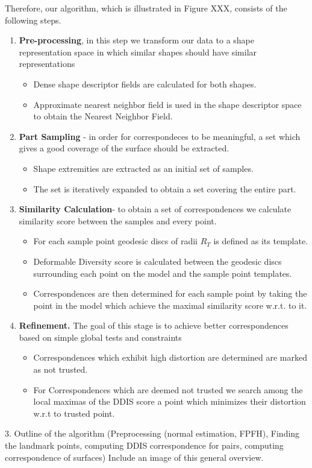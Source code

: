 \documentclass[10pt,twocolumn,letterpaper]{article}
\begin{document}
Therefore, our algorithm, which is illustrated in Figure XXX, consists of the following steps.
\begin{enumerate}
    \item 
    \textbf{Pre-processing}, in this step we transform our data to a shape representation space in which similar shapes should have similar representations
    \begin{itemize}
     \item Dense shape descriptor fields are calculated for both shapes.
     \item Approximate nearest neighbor field is used in the shape descriptor space to obtain the Nearest Neighbor Field.
   \end{itemize}
   \item
   \textbf{Part Sampling} - in order for correspondeces to be meaningful, a set which gives a good coverage of the surface should be extracted.
   \begin{itemize}
     \item Shape extremities are extracted as an initial set of samples.
     \item The set is iteratively expanded to obtain a set covering the entire part.
   \end{itemize}
   \item
   \textbf{Similarity Calculation}- to obtain a set of correspondences we calculate similarity score between the samples and every point.
      \begin{itemize}
        \item For each sample point geodesic discs of radii $ R_T$ is defined as its template.
        \item Deformable Diversity score is calculated between the geodesic discs surrounding each point on the model and the sample point templates.
        \item Correspondences are then determined for each sample point by taking the point in the model which achieve the maximal similarity score w.r.t. to it.
       \end{itemize}
   \item

    \textbf{Refinement.} The goal of this stage is to achieve better correspondences based on simple global tests and constraints
      \begin{itemize}
        \item Correspondences which exhibit high distortion are determined are marked as not trusted.
        \item For Correspondences which are deemed not trusted we search among the local maximas of the DDIS score a point which minimizes their distortion w.r.t to trusted point.

   \end{itemize}

\end{enumerate}
{\color{red} 	3. Outline of the algorithm (Preprocessing (normal estimation, FPFH), Finding the landmark points, computing DDIS correspondence for pairs, computing correspondence of surfaces)
	Include an image of this general overview.}
\end{document}

